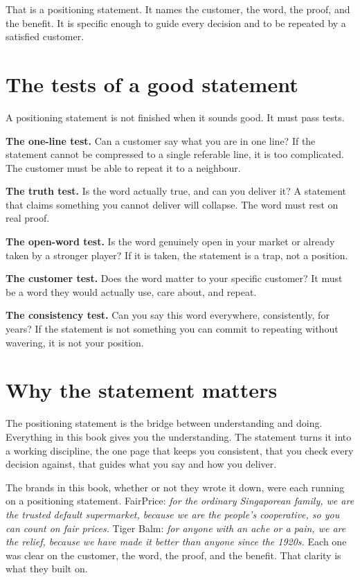 \documentclass[10pt,twoside,openany]{memoir}
\newcommand{\needspacehead}{\needspace{4\baselineskip}}
\let\oldsection\section
\renewcommand{\section}{\needspacehead\oldsection}
\begin{document}
{That is a positioning statement. It names the customer, the word, the
proof, and the benefit. It is specific enough to guide every decision
and to be repeated by a satisfied customer.

\section{The tests of a good
statement}\label{the-tests-of-a-good-statement}

A positioning statement is not finished when it sounds good. It must
pass tests.

\textbf{The one-line test.} Can a customer say what you are in one line?
If the statement cannot be compressed to a single referable line, it is
too complicated. The customer must be able to repeat it to a neighbour.

\textbf{The truth test.} Is the word actually true, and can you deliver
it? A statement that claims something you cannot deliver will collapse.
The word must rest on real proof.

\textbf{The open-word test.} Is the word genuinely open in your market
or already taken by a stronger player? If it is taken, the statement is
a trap, not a position.

\textbf{The customer test.} Does the word matter to your specific
customer? It must be a word they would actually use, care about, and
repeat.

\textbf{The consistency test.} Can you say this word everywhere,
consistently, for years? If the statement is not something you can
commit to repeating without wavering, it is not your position.

\section{Why the statement matters}\label{why-the-statement-matters}

The positioning statement is the bridge between understanding and doing.
Everything in this book gives you the understanding. The statement turns
it into a working discipline, the one page that keeps you consistent,
that you check every decision against, that guides what you say and how
you deliver.

The brands in this book, whether or not they wrote it down, were each
running on a positioning statement. FairPrice: \emph{for the ordinary
Singaporean family, we are the trusted default supermarket, because we
are the people's cooperative, so you can count on fair prices.} Tiger
Balm: \emph{for anyone with an ache or a pain, we are the relief,
because we have made it better than anyone since the 1920s.} Each one
was clear on the customer, the word, the proof, and the benefit. That
clarity is what they built on.

}
\end{document}
